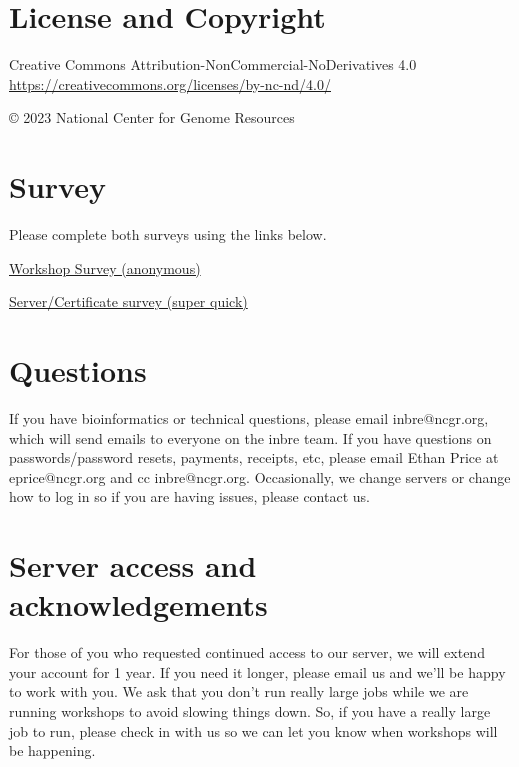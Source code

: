 \documentclass[
]{book}
\begin{document}
\hypertarget{license-and-copyright-1}{%
\section{License and Copyright}\label{license-and-copyright-1}}

Creative Commons Attribution-NonCommercial-NoDerivatives 4.0
\url{https://creativecommons.org/licenses/by-nc-nd/4.0/}

© 2023 National Center for Genome Resources

\hypertarget{survey}{%
\section{Survey}\label{survey}}

Please complete both surveys using the links below.

\href{https://docs.google.com/forms/d/e/1FAIpQLScjtEvK-ywP9DEbTNsIcIn4YMe9evXvhmp-NVzn-t4MSakXig/viewform?usp=sf_link}{Workshop Survey (anonymous)}

\href{https://docs.google.com/forms/d/e/1FAIpQLSfGZwX2BL_ZyGgmvh4v41Q_886y-OiTESTbpvzoyR0J3BxC5Q/viewform?usp=sf_link}{Server/Certificate survey (super quick)}

\hypertarget{questions}{%
\section{Questions}\label{questions}}

If you have bioinformatics or technical questions, please email inbre@ncgr.org, which will send emails to everyone on the inbre team. If you have questions on passwords/password resets, payments, receipts, etc, please email Ethan Price at eprice@ncgr.org and cc inbre@ncgr.org. Occasionally, we change servers or change how to log in so if you are having issues, please contact us.

\hypertarget{server-access-and-acknowledgements}{%
\section{Server access and acknowledgements}\label{server-access-and-acknowledgements}}

For those of you who requested continued access to our server, we will extend your account for 1 year. If you need it longer, please email us and we'll be happy to work with you. We ask that you don't run really large jobs while we are running workshops to avoid slowing things down. So, if you have a really large job to run, please check in with us so we can let you know when workshops will be happening.
\end{document}

